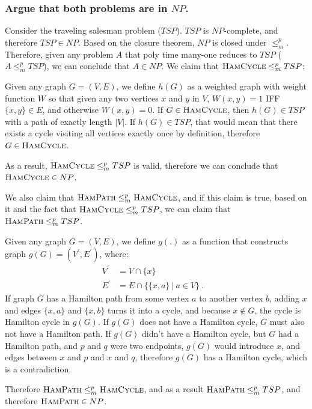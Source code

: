 \documentclass[12pt, letterpaper]{article}
\begin{document}
\subsubsection*{Argue that both problems are in $NP$.}
Consider the traveling salesman problem ($TSP$).
$TSP$ is $NP$-complete, and therefore $TSP \in NP$.
Based on the closure theorem, $NP$ is closed under $\leq^p_m$.
Therefore, given any problem $A$ that poly time many-one reduces to $TSP$ ($A \leq^p_m TSP$), we can conclude that $A \in NP$.
We claim that $\textsc{HamCycle} \leq^p_m TSP$:

Given any graph $G=(V, E)$, we define $h(G)$ as a weighted graph with weight function $W$ so that given any two vertices $x$ and $y$ in $V$, $W(x, y) = 1$ IFF $\{x , y \} \in E$, and otherwise $W(x, y) = 0$.
If $G \in \textsc{HamCycle}$, then $h(G) \in TSP$ with a path of exactly length $|V|$.
If $h(G) \in TSP$, that would mean that there exists a cycle visiting all vertices exactly once by definition, therefore $G \in \textsc{HamCycle}$.

As a result, $\textsc{HamCycle} \leq^p_m TSP$ is valid, therefore we can conclude that $\textsc{HamCycle} \in NP$.

We also claim that $\textsc{HamPath} \leq^p_m \textsc{HamCycle}$, and if this claim is true, based on it and the fact that $\textsc{HamCycle} \leq^p_m TSP$, we can claim that $\textsc{HamPath} \leq^p_m TSP$.

Given any graph $G = (V, E)$, we define $g(.)$ as a function that constructs graph $g(G) = (V^\prime , E^\prime)$, where:
\begin{align*}
    V^\prime &= V \cap \{ x \} & \\
    E^\prime &= E \cap  \{ \{ x, a \} \ | \ a \in V \} \ .
\end{align*}
If graph $G$ has a Hamilton path from some vertex $a$ to another vertex $b$, adding $x$ and edges $\{ x , a \}$ and $\{ x , b \}$ turns it into a cycle, and because $x \notin G$, the cycle is Hamilton cycle in $g(G)$.
If $g(G)$ does not have a Hamilton cycle, $G$ must also not have a Hamilton path. 
If $g(G)$ didn't have a Hamilton cycle, but $G$ had a Hamilton path, and $p$ and $q$ were two endpoints, $g(G)$ would introduce $x$, and edges between $x$ and $p$ and $x$ and $q$, therefore $g(G)$ has a Hamilton cycle, which is a contradiction.

Therefore $\textsc{HamPath} \leq^p_m \textsc{HamCycle}$, and as a result $\textsc{HamPath} \leq^p_m TSP$, and therefore $\textsc{HamPath} \in NP$.
\end{document}
